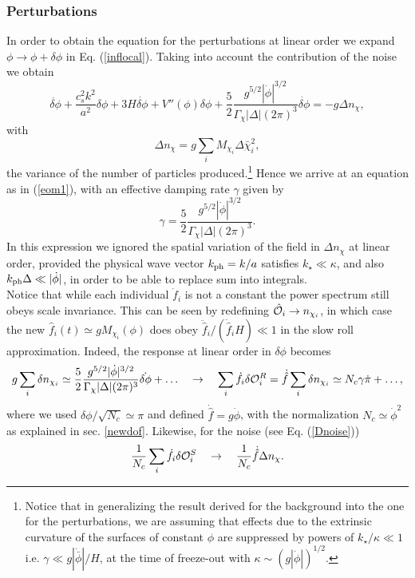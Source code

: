\documentclass[11pt,amsmath,floats,floatfix,nofootinbib,secnumarabic, superscriptaddress, tightenlines]{revtex4}
\newcommand{\beq}{\begin{equation}}
\newcommand{\eeq}{\end{equation}}
\newcommand{\be}{\begin{equation}}
\newcommand{\ee}{\end{equation}}
\newcommand{\calo}{{\cal O}}
\newcommand{\bphi}{{\bar\phi}}
\begin{document}
{\subsubsection{Perturbations}

In order to obtain the equation for the perturbations at linear order we expand $\phi \to \phi+\delta\phi$ in Eq. (\ref{inflocal}). Taking into account the contribution of the noise we obtain
\be
\label{pertinflocal}
\ddot{\delta\phi}+\frac{c_s^2k^2}{a^2}\delta\phi+3H\dot{\delta\phi}+V''(\phi)\delta\phi+\frac{5}{2}\frac{g^{5/2} |\dot{\phi}|^{3/2}}{\Gamma_\chi|\Delta|(2\pi)^3}\dot{\delta\phi}=-g \Delta n_{\chi},\ee
with \beq \label{Dnoise} \Delta n_{\chi} = g \sum_i M_{\chi_i} \Delta \bar \chi_i^2, \eeq the variance of the number of particles produced.\footnote{Notice
that in generalizing the result derived for the background into the one for the perturbations, we are assuming that effects due to the extrinsic curvature
 of the surfaces of constant $\phi$ are suppressed by powers of $k_\star/\kappa\ll 1$  i.e. $\gamma \ll g|\dot\bphi|/H$, at the time of freeze-out with
$\kappa\sim (g|\dot\phi|)^{1/2}$.} Hence we arrive at an equation as in (\ref{eom1}), with an effective damping rate $\gamma$ given by
\be
\gamma=\frac{5}{2}\frac{g^{5/2} |\dot{\phi}|^{3/2}}{\Gamma_\chi|\Delta|(2\pi)^3}.
\ee
In this expression we ignored the spatial variation of the field in $\Delta n_\chi$ at linear order, provided the physical wave vector $k_{\rm ph}=k/a$ satisfies $k_\star\ll \kappa$, and also $k_{\rm ph}\Delta\ll|\dot{\phi}|$, in order to be able to replace sum into integrals.\\

Notice that while each individual $\dot f_i$ is not a constant the power spectrum still obeys scale invariance. This can be seen by redefining $\hat \calo_i \to n_{\chi_i}$, in which case the new $\hat f_i(t) \simeq g M_{\chi_i}(\phi)$ does obey $\ddot {\hat f}_i/(\dot{\hat f}_iH) \ll 1$ in
 the slow roll approximation. Indeed, the response at linear order in $\delta\phi$ becomes
\beq
g \sum_i \delta n_{\chi_i} \simeq \frac{5}{2}\frac{g^{5/2} |\dot{\phi}|^{3/2}}{\Gamma_\chi|\Delta|(2\pi)^3} \dot{\delta\phi} +\ldots \quad\to\quad \sum_i \dot f_i \delta\calo_i^R =\dot{\hat f}  \sum_i \delta n_{\chi_i} \simeq N_c \gamma \dot\pi +\ldots,
\eeq
where we used $\delta\phi/\sqrt{N_c} \simeq \pi$ and defined $\dot {\hat f} = g\dot\phi$, with the normalization $N_c \simeq \dot\phi^2$ as explained in sec. \ref{newdof}. Likewise, for the noise (see Eq. (\ref{Dnoise}))
\beq \label{noiseng} \frac{1}{N_c}\sum_i \dot f_i \delta\calo_i^S\quad \to\quad \frac{1}{N_c} \dot{\hat f} \Delta n_{\chi}.
\eeq

}
\end{document}
